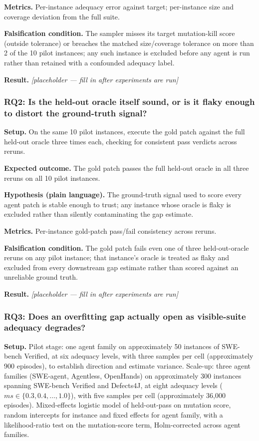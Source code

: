 \documentclass[11pt]{article}
\newcommand{\ph}{\textit{[placeholder --- fill in after experiments are run]}}
\begin{document}
\textbf{Metrics.} Per-instance adequacy error against target; per-instance size and coverage deviation from the full suite.

\textbf{Falsification condition.} The sampler misses its target mutation-kill score (outside tolerance) or breaches the matched size/coverage tolerance on more than 2 of the 10 pilot instances; any such instance is excluded before any agent is run rather than retained with a confounded adequacy label.

\textbf{Result.} \ph

\subsubsection{RQ2: Is the held-out oracle itself sound, or is it flaky enough to distort the ground-truth signal?}
\textbf{Setup.} On the same 10 pilot instances, execute the gold patch against the full held-out oracle three times each, checking for consistent pass verdicts across reruns.

\textbf{Expected outcome.} The gold patch passes the full held-out oracle in all three reruns on all 10 pilot instances.

\textbf{Hypothesis (plain language).} The ground-truth signal used to score every agent patch is stable enough to trust; any instance whose oracle is flaky is excluded rather than silently contaminating the gap estimate.

\textbf{Metrics.} Per-instance gold-patch pass/fail consistency across reruns.

\textbf{Falsification condition.} The gold patch fails even one of three held-out-oracle reruns on any pilot instance; that instance's oracle is treated as flaky and excluded from every downstream gap estimate rather than scored against an unreliable ground truth.

\textbf{Result.} \ph

\subsubsection{RQ3: Does an overfitting gap actually open as visible-suite adequacy degrades?}
\textbf{Setup.} Pilot stage: one agent family on approximately 50 instances of SWE-bench Verified, at six adequacy levels, with three samples per cell (approximately 900 episodes), to establish direction and estimate variance. Scale-up: three agent families (SWE-agent, Agentless, OpenHands) on approximately 300 instances spanning SWE-bench Verified and Defects4J, at eight adequacy levels ($ms \in \{0.3, 0.4, \dots, 1.0\}$), with five samples per cell (approximately 36{,}000 episodes). Mixed-effects logistic model of held-out-pass on mutation score, random intercepts for instance and fixed effects for agent family, with a likelihood-ratio test on the mutation-score term, Holm-corrected across agent families.
\end{document}
